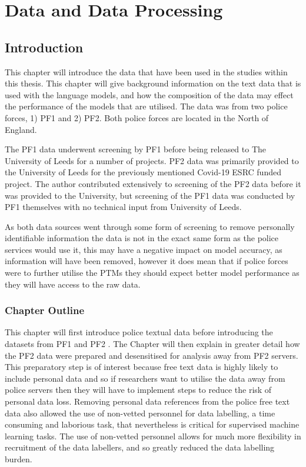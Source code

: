 \chapter{Data and Data Processing}


\section{Introduction} 

This chapter will introduce the data that have been used in the studies within this thesis. This chapter will give background information on the text data that is used with the language models, and how the composition of the data may effect the performance of the models that are utilised. The data was from two police forces, 1) PF1  and 2) PF2. Both police forces are located in the North of England. 

The PF1 data underwent screening by PF1 before being released to The University of Leeds for a number of projects. PF2 data was primarily provided to the University of Leeds for the previously mentioned Covid-19 ESRC funded project. The author contributed extensively to screening of the PF2 data before it was provided to the University, but screening of the PF1 data was conducted by PF1 themselves with no technical input from University of Leeds.  

As both data sources went through some form of screening to remove personally identifiable information the data is not in the exact same form as the police services would use it, this may have a negative impact on model accuracy, as information will have been removed, however it does mean that if police forces were to further utilise the PTMs they should expect better model performance as they will have access to the raw data.

\subsection{Chapter Outline}
This chapter will first introduce police textual data  before introducing the datasets from PF1 and PF2 . The Chapter will then explain in greater detail how the PF2 data were prepared and desensitised for analysis away from PF2 servers. This preparatory step is of interest because free text data is highly likely to include personal data and so if researchers want to utilise the data away from police servers then they will have to implement steps to reduce the risk of personal data loss. Removing personal data references from the police free text data also allowed the use of non-vetted personnel for data labelling, a time consuming and laborious task, that nevertheless is critical for supervised machine learning tasks. The use of non-vetted personnel allows for much more flexibility in recruitment of the data labellers, and so greatly reduced the data labelling burden. 

